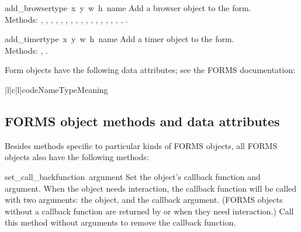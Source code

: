 \begin{flushleft}
\begin{funcdesc}{add_browser}{type\, x\, y\, w\, h\, name}
Add a browser object to the form. \\
Methods:
,
,
,
,
,
,
,
,
,
,
,
,
,
,
,
,
,
.
\end{funcdesc}


\begin{funcdesc}{add_timer}{type\, x\, y\, w\, h\, name}
Add a timer object to the form. \\
Methods:
,
.
\end{funcdesc}
\end{flushleft}

Form objects have the following data attributes; see the FORMS
documentation:

\begin{tableiii}{|l|c|l|}{code}{Name}{Type}{Meaning}
\end{tableiii}

\subsection{FORMS object methods and data attributes}

Besides methods specific to particular kinds of FORMS objects, all
FORMS objects also have the following methods:

\renewcommand{\indexsubitem}{(FORMS object method)}
\begin{funcdesc}{set_call_back}{function\, argument}
Set the object's callback function and argument.  When the object
needs interaction, the callback function will be called with two
arguments: the object, and the callback argument.  (FORMS objects
without a callback function are returned by  or
 when they need interaction.)  Call this method
without arguments to remove the callback function.
\end{funcdesc}

